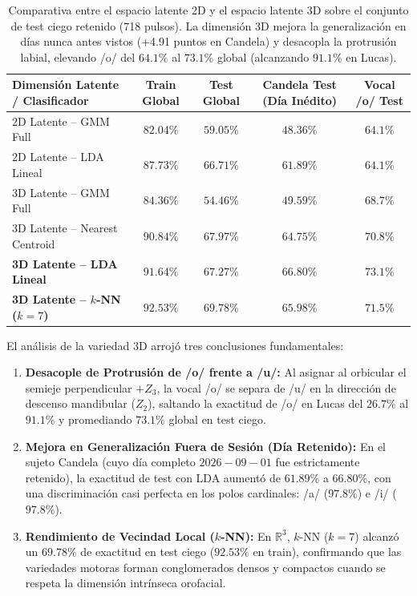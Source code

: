 \documentclass[11pt,a4paper,openany]{book}
\theoremstyle{definition}
\begin{document}
\begin{table}[H]
\centering
\small
\begin{tabular}{lcccc}
\hline
\textbf{Dimensión Latente / Clasificador} & \textbf{Train Global} & \textbf{Test Global} & \textbf{Candela Test (Día Inédito)} & \textbf{Vocal /o/ Test} \\
\hline
2D Latente -- GMM Full & $82.04\%$ & $59.05\%$ & $48.36\%$ & $64.1\%$ \\
2D Latente -- LDA Lineal & $87.73\%$ & $66.71\%$ & $61.89\%$ & $64.1\%$ \\
\hline
3D Latente -- GMM Full & $84.36\%$ & $54.46\%$ & $49.59\%$ & $68.7\%$ \\
3D Latente -- Nearest Centroid & $90.84\%$ & $67.97\%$ & $64.75\%$ & $70.8\%$ \\
\textbf{3D Latente -- LDA Lineal} & $\mathbf{91.64\%}$ & $\mathbf{67.27\%}$ & $\mathbf{66.80\%}$ & $\mathbf{73.1\%}$ \\
\textbf{3D Latente -- $k$-NN ($k=7$)} & $\mathbf{92.53\%}$ & $\mathbf{69.78\%}$ & $\mathbf{65.98\%}$ & $\mathbf{71.5\%}$ \\
\hline
\end{tabular}
\caption{Comparativa entre el espacio latente 2D y el espacio latente 3D sobre el conjunto de test ciego retenido (718 pulsos). La dimensión 3D mejora la generalización en días nunca antes vistos (+4.91 puntos en Candela) y desacopla la protrusión labial, elevando /o/ del $64.1\%$ al $73.1\%$ global (alcanzando $91.1\%$ en Lucas).}
\label{tab:comparativa_2d_vs_3d_test}
\end{table}

El análisis de la variedad 3D arrojó tres conclusiones fundamentales:
\begin{enumerate}
    \item \textbf{Desacople de Protrusión de /o/ frente a /u/:} Al asignar al orbicular el semieje perpendicular $+Z_3$, la vocal /o/ se separa de /u/ en la dirección de descenso mandibular ($Z_2$), saltando la exactitud de /o/ en Lucas del $26.7\%$ al $91.1\%$ y promediando $73.1\%$ global en test ciego.
    \item \textbf{Mejora en Generalización Fuera de Sesión (Día Retenido):} En el sujeto Candela (cuyo día completo $2026-09-01$ fue estrictamente retenido), la exactitud de test con LDA aumentó de $61.89\%$ a $66.80\%$, con una discriminación casi perfecta en los polos cardinales: /a/ ($97.8\%$) e /i/ ($97.8\%$).
    \item \textbf{Rendimiento de Vecindad Local ($k$-NN):} En $\mathbb{R}^3$, $k$-NN ($k=7$) alcanzó un $69.78\%$ de exactitud en test ciego ($92.53\%$ en train), confirmando que las variedades motoras forman conglomerados densos y compactos cuando se respeta la dimensión intrínseca orofacial.
\end{enumerate}
\end{document}
